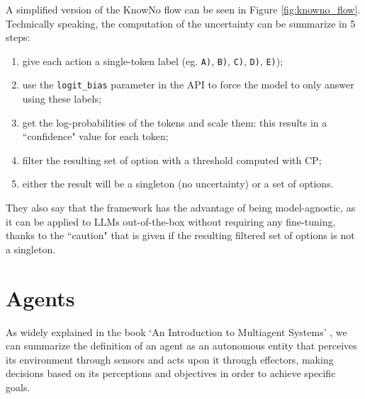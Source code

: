 A simplified version of the KnowNo flow can be seen in Figure
\ref{fig:knowno_flow}. Technically speaking, the computation of the uncertainty
can be summarize in 5 steps:
\begin{enumerate}
  \item give each action a single-token label (eg. \texttt{A)}, \texttt{B)}, \texttt{C)},
    \texttt{D)}, \texttt{E)});

  \item use the \texttt{logit\_bias} parameter in the API to force the model to
    only answer using these labels;

  \item get the log-probabilities of the tokens and scale them: this results in
    a ``confidence" value for each token;

  \item filter the resulting set of option with a threshold computed with CP;

  \item either the result will be a singleton (no uncertainty) or a set of options.
\end{enumerate}

They also say that the framework has the advantage of being model-agnostic, as it
can be applied to LLMs out-of-the-box without requiring any fine-tuning, thanks
to the ``caution" that is given if the resulting filtered set of options is not a
singleton.

\section{Agents}
\label{sec:agents}


As widely explained in the book `An Introduction to Multiagent Systems' \cite{wooldridge2002multiagent},
we can summarize the definition of an agent as an autonomous entity that
perceives its environment through sensors and acts upon it through effectors, making
decisions based on its perceptions and objectives in order to achieve specific goals.

